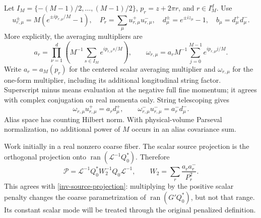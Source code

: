 \documentclass[11pt]{article}
\theoremstyle{remark}
\begin{document}
Let $I_M=\{-(M-1)/2,\ldots,(M-1)/2\}$,
$p_r=z+2\pi r$, and $r\in I_M^d$. Use
\[
 u_{r,\mu}^{\pm}=M(e^{\pm ip_{r,\mu}/M}-1),\quad
 P_r=\sum_\mu u_{r,\mu}^+u_{r,\mu}^-,\quad
 d_\mu^\pm=e^{\pm iz_\mu}-1,\quad b_\mu=d_\mu^+d_\mu^-.
\]
More explicitly, the averaging multipliers are
\[
 a_r=\prod_{\nu=1}^d\left(M^{-1}\sum_{s\in I_M}
       e^{ip_{r,\nu}s/M}\right),\qquad
 \omega_{r,\mu}=a_r M^{-1}\sum_{j=0}^{M-1}e^{ip_{r,\mu}j/M}.
\]
Write $a_r=a_M(p_r)$ for the centered scalar averaging multiplier
and $\omega_{r,\mu}$ for the one-form multiplier, including its
additional longitudinal string factor. Superscript minus means
evaluation at the negative full fine momentum; it agrees with
complex conjugation on real momenta only. String telescoping gives
\begin{equation}\label{inv-cochain}
 \omega_{r,\mu}u_{r,\mu}^+=a_r d_\mu^+,
 \qquad \omega_{r,\mu}^-u_{r,\mu}^-=a_r^-d_\mu^-.
\end{equation}
Alias space has counting Hilbert norm. With physical-volume Parseval
normalization, no additional power of $M$ occurs in an alias covariance
sum.

Work initially in a real nonzero coarse fiber. The scalar source
projection is the orthogonal projection onto
$\operatorname{ran}(\mathcal L^{-1}Q_0^*)$. Therefore
\begin{equation}\label{inv-projection-alias}
 \mathcal P=\mathcal L^{-1}Q_0^*W_2^{-1}Q_0\mathcal L^{-1},
 \qquad W_2=\sum_r\frac{a_ra_r^-}{P_r^2}.
\end{equation}
This agrees with \eqref{inv-source-projection}: multiplying by the
positive scalar penalty changes the coarse parametrization of
$\operatorname{ran}(G'Q_0^*)$, but not that range. Its constant scalar
mode will be treated through the original penalized definition.
\end{document}
